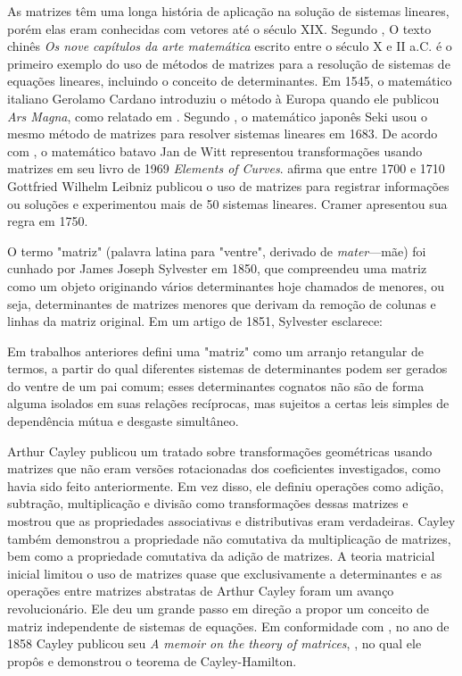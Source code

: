 \documentclass[a4paper,12pt]{article}
\newenvironment{citlong}
{\vspace{0.5cm}\hfill\begin{minipage}[c]{12cm}\setstretch{1.0}\small}
{\end{minipage}\vspace{0.5cm}}
\begin{document}
As matrizes têm uma longa história de aplicação na solução de sistemas lineares, porém elas eram conhecidas com vetores até o século XIX. Segundo \cite{LUN}, O texto chinês \textit{Os nove capítulos da arte matemática} escrito entre o século X e II a.C. é o primeiro exemplo do uso de métodos de matrizes para a resolução de sistemas de equações lineares, incluindo o conceito de determinantes. Em 1545, o matemático italiano Gerolamo Cardano introduziu o método à Europa quando ele publicou \textit{Ars Magna}, como relatado em \cite{DOSSEY}. Segundo \cite{NEEDHAM}, o matemático japonês Seki usou o mesmo método de matrizes para resolver sistemas lineares em 1683. De acordo com \cite{OTTO}, o matemático batavo Jan de Witt representou transformações usando matrizes em seu livro de 1969 \textit{Elements of Curves}. \cite{OTTO} afirma que entre 1700 e 1710 Gottfried Wilhelm Leibniz publicou o uso de matrizes para registrar informações ou soluções e experimentou mais de 50 sistemas lineares. Cramer apresentou sua regra em 1750.

O termo "matriz" (palavra latina para "ventre", derivado de \textit{mater}---mãe) foi cunhado por James Joseph Sylvester em 1850, que compreendeu uma matriz como um objeto originando vários determinantes hoje chamados de menores, ou seja, determinantes de matrizes menores que derivam da remoção de colunas e linhas da matriz original. Em um artigo de 1851, Sylvester esclarece:

\begin{citlong}

Em trabalhos anteriores defini uma "matriz" como um arranjo retangular de termos, a partir do qual diferentes sistemas de determinantes podem ser gerados do ventre de um pai comum; esses determinantes cognatos não são de forma alguma isolados em suas relações recíprocas, mas sujeitos a certas leis simples de dependência mútua e desgaste simultâneo.

\citep[p.247]{SYLVESTER}

\end{citlong}

Arthur Cayley publicou um tratado sobre transformações geométricas usando matrizes que não eram versões rotacionadas dos coeficientes investigados, como havia sido feito anteriormente. Em vez disso, ele definiu operações como adição, subtração, multiplicação e divisão como transformações dessas matrizes e mostrou que as propriedades associativas e distributivas eram verdadeiras. Cayley também demonstrou a propriedade não comutativa da multiplicação de matrizes, bem como a propriedade comutativa da adição de matrizes. A teoria matricial inicial limitou o uso de matrizes quase que exclusivamente a determinantes e as operações entre matrizes abstratas de Arthur Cayley foram um avanço revolucionário. Ele deu um grande passo em direção a propor um conceito de matriz independente de sistemas de equações. Em conformidade com \cite{STINSON}, no ano de 1858 Cayley publicou seu \textit{A memoir on the theory of matrices}, \cite{CAYLEY}, no qual ele propôs e demonstrou o teorema de Cayley-Hamilton.
\end{document}
